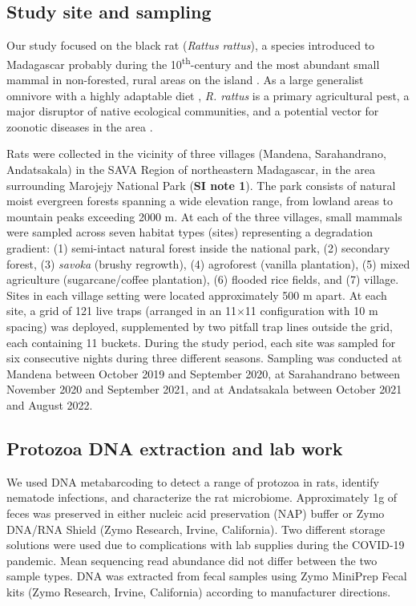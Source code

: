 \documentclass[oneside, a4paper, onecolumn, 11pt]{article}
\begin{document}
\subsection*{Study site and sampling}
Our study focused on the black rat (\textit{Rattus rattus}), a species introduced to Madagascar probably during the 10\textsuperscript{th}-century and the most abundant small mammal in non-forested, rural areas on the island \cite{Brouat2014-xd,Scobie2024-rc,Randriamoria2014-gj}. As a large generalist omnivore with a highly adaptable diet \cite{Dammhahn2017-rz}, \textit{R. rattus} is a primary agricultural pest, a major disruptor of native ecological communities, and a potential vector for zoonotic diseases in the area \cite{Randriamoria2014-gj, Rahelinirina2010-li}.

Rats were collected in the vicinity of three villages (Mandena, Sarahandrano, Andatsakala) in the SAVA Region of northeastern Madagascar, in the area surrounding Marojejy National Park (\textbf{SI note 1}). The park consists of natural moist evergreen forests spanning a wide elevation range, from lowland areas to mountain peaks exceeding 2000 m. At each of the three villages, small mammals were sampled across seven habitat types (sites) representing a degradation gradient: (1) semi-intact natural forest inside the national park, (2) secondary forest, (3) \textit{savoka} (brushy regrowth), (4) agroforest (vanilla plantation), (5) mixed agriculture (sugarcane/coffee plantation), (6) flooded rice fields, and (7) village. Sites in each village setting were located approximately 500 m apart. At each site, a grid of 121 live traps (arranged in an 11$\times$11 configuration with 10 m spacing) was deployed, supplemented by two pitfall trap lines outside the grid, each containing 11 buckets. During the study period, each site was sampled for six consecutive nights during three different seasons. Sampling was conducted at Mandena between October 2019 and September 2020, at Sarahandrano between November 2020 and September 2021, and at Andatsakala between October 2021 and August 2022.

\subsection*{Protozoa DNA extraction and lab work}
We used DNA metabarcoding to detect a range of protozoa in rats, identify nematode infections, and characterize the rat microbiome. Approximately 1g of feces was preserved in either nucleic acid preservation (NAP) buffer \citep{Camacho-Sanchez2013-my} or Zymo DNA/RNA Shield (Zymo Research, Irvine, California). Two different storage solutions were used due to complications with lab supplies during the COVID-19 pandemic. Mean sequencing read abundance did not differ between the two sample types. DNA was extracted from fecal samples using Zymo MiniPrep Fecal kits (Zymo Research, Irvine, California) according to manufacturer directions. 
\end{document}
